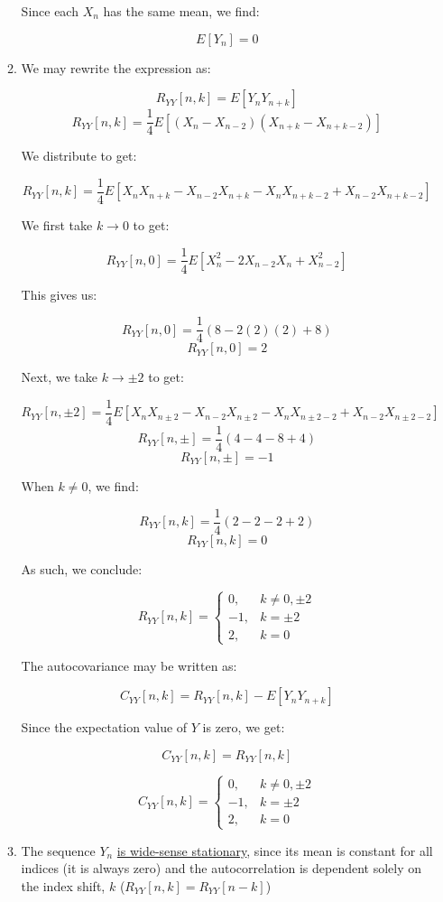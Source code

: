 \begin{enumerate}
\begin{enumerate}
        Since each $X_n$ has the same mean, we find:

        $$\boxed{E[Y_n]=0}$$

      \item We may rewrite the expression as:

        $$R_{YY}[n,k]=E[Y_nY_{n+k}]$$
        $$R_{YY}[n,k]=\frac{1}{4}E[(X_n-X_{n-2})(X_{n+k}-X_{n+k-2})]$$

        We distribute to get:

        $$R_{YY}[n,k]=\frac{1}{4}E[X_nX_{n+k}-X_{n-2}X_{n+k}-X_nX_{n+k-2}+X_{n-2}X_{n+k-2}]$$

        We first take $k\to0$ to get:

        $$R_{YY}[n,0]=\frac{1}{4}E[X_n^2-2X_{n-2}X_{n}+X_{n-2}^2]$$

        This gives us:

        $$R_{YY}[n,0]=\frac{1}{4}(8-2(2)(2)+8)$$
        $$R_{YY}[n,0]=2$$

        Next, we take $k\to\pm2$ to get:

        $$R_{YY}[n,\pm2]=\frac{1}{4}E[X_nX_{n\pm2}-X_{n-2}X_{n\pm2}-X_nX_{n\pm2-2}+X_{n-2}X_{n\pm2-2}]$$
        $$R_{YY}[n,\pm]=\frac{1}{4}(4-4-8+4)$$
        $$R_{YY}[n,\pm]=-1$$

        When $k\neq0$, we find:

        $$R_{YY}[n,k]=\frac{1}{4}(2-2-2+2)$$
        $$R_{YY}[n,k]=0$$

        As such, we conclude:

        $$\boxed{R_{YY}[n,k]=\left\{\begin{array}{ll} 0, & k\neq0,\pm2\\ -1, & k=\pm2\\2, & k=0\end{array}}$$

        The autocovariance may be written as:

        $$C_{YY}[n,k]=R_{YY}[n,k]-E[Y_nY_{n+k}]$$

        Since the expectation value of $Y$ is zero, we get:

        $$C_{YY}[n,k]=R_{YY}[n,k]$$

        $$\boxed{C_{YY}[n,k]=\left\{\begin{array}{ll} 0, & k\neq0,\pm2\\ -1, & k=\pm2\\2, & k=0\end{array}}$$

        \item The sequence $Y_n$ \underline{is wide-sense stationary}, since its mean is constant for all indices (it is always zero) and the autocorrelation is dependent solely on the index shift, $k$ ($R_{YY}[n,k]=R_{YY}[n-k]$)


\end{enumerate}
\end{enumerate}
